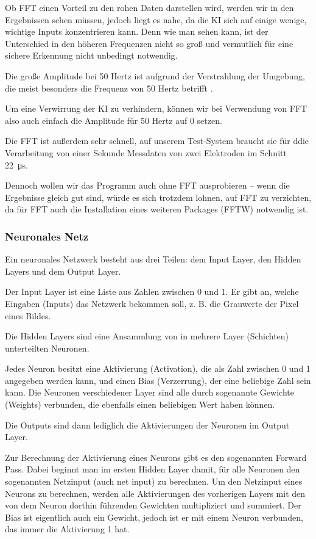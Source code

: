 \documentclass{scrartcl}
\begin{document}
	Ob FFT einen Vorteil zu den rohen Daten darstellen wird, werden wir in den Ergebnissen sehen müssen, jedoch liegt es nahe, da die KI sich auf einige wenige, wichtige Inputs konzentrieren kann. Denn wie man sehen kann, ist der Unterschied in den höheren Frequenzen nicht so groß und vermutlich für eine sichere Erkennung nicht unbedingt notwendig.

	Die große Amplitude bei 50 Hertz ist aufgrund der Verstrahlung der Umgebung, die meist besonders die Frequenz von 50 Hertz betrifft \cite{Praktikum}. %

	Um eine Verwirrung der KI zu verhindern, können wir bei Verwendung von FFT also auch einfach die Amplitude für 50 Hertz auf 0 setzen.

	Die FFT ist außerdem sehr schnell, auf unserem Test-System braucht sie für ddie Verarbeitung von einer Sekunde Messdaten von zwei Elektroden im Schnitt \qty{22}{\micro\second}.

	Dennoch wollen wir das Programm auch ohne FFT ausprobieren -- wenn die Ergebnisse gleich gut sind, würde es sich trotzdem lohnen, auf FFT zu verzichten, da für FFT auch die Installation eines weiteren Packages (FFTW) notwendig ist. 

	\subsubsection{Neuronales Netz}

	Ein neuronales Netzwerk besteht aus drei Teilen: dem Input Layer, den Hidden Layers und dem Output Layer.

	Der Input Layer ist eine Liste aus Zahlen zwischen 0 und 1. Er gibt an, welche Eingaben (Inputs) das Netzwerk bekommen soll, z. B. die Grauwerte der Pixel eines Bildes.
	
	Die Hidden Layers sind eine Ansammlung von in mehrere Layer (Schichten) unterteilten Neuronen.
	
	Jedes Neuron besitzt eine Aktivierung (Activation), die als Zahl zwischen 0 und 1 angegeben werden kann, und einen Bias (Verzerrung), der eine beliebige Zahl sein kann. Die Neuronen verschiedener Layer sind alle durch sogenannte Gewichte (Weights) verbunden, die ebenfalls einen beliebigen Wert haben können.

	Die Outputs sind dann lediglich die Aktivierungen der Neuronen im Output Layer.


	Zur Berechnung der Aktivierung eines Neurons gibt es den sogenannten Forward Pass. Dabei beginnt man im ersten Hidden Layer damit, für alle Neuronen den sogenannten Netzinput (auch net input) zu berechnen. Um den Netzinput eines Neurons zu berechnen, werden alle Aktivierungen des vorherigen Layers mit den von dem Neuron dorthin führenden Gewichten multipliziert und summiert. Der Bias ist eigentlich auch ein Gewicht, jedoch ist er mit einem Neuron verbunden, das immer die Aktivierung 1 hat.
\end{document}
